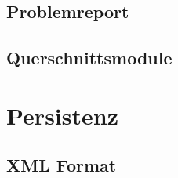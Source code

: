 \subsection{Problemreport}

\subsection{Querschnittsmodule}



\section{Persistenz}

\subsection{XML Format}




